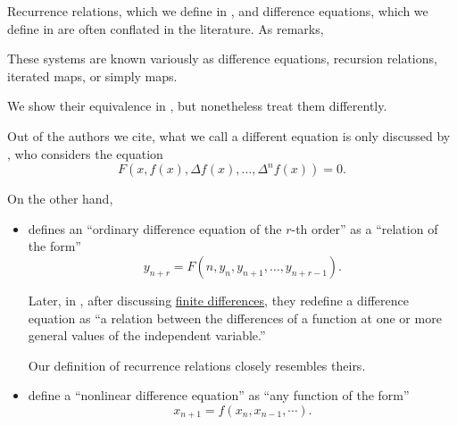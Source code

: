 \begin{remark}\label{rem:recurrence_relations_and_difference_equations_literature_overview_literature_overview}
  Recurrence relations, which we define in , and difference equations, which we define in  are often conflated in the literature. As  remarks,
  \begin{displayquote}
    These systems are known variously as difference equations, recursion relations, iterated maps, or simply maps.
  \end{displayquote}

  We show their equivalence in , but nonetheless treat them differently.

  Out of the authors we cite, what we call a different equation is only discussed by , who considers the equation
  \begin{equation*}
    F(x, f(x), \Delta f(x), \ldots, \Delta^n f(x)) = 0.
  \end{equation*}

  On the other hand,
  \begin{itemize}
    \item {} defines an \enquote{ordinary difference equation of the \( r \)-th order} as a \enquote{relation of the form}
    \begin{equation*}
      y_{n+r} = F(n, y_n, y_{n+1}, \ldots, y_{n+r-1}).
    \end{equation*}

    Later, in \cite[75]{LevyLessman1961FiniteDifferenceEquations}, after discussing \hyperref[def:finite_difference_operator]{finite differences}, they redefine a difference equation as \enquote{a relation between the differences of a function at one or more general values of the independent variable.}

    Our definition of recurrence relations closely resembles theirs.

    \item {} define a \enquote{nonlinear difference equation} as \enquote{any function of the form}
    \begin{equation*}
      x_{n+1} = f(x_n, x_{n-1}, \cdots).
    \end{equation*}


\end{itemize}
\end{remark}
